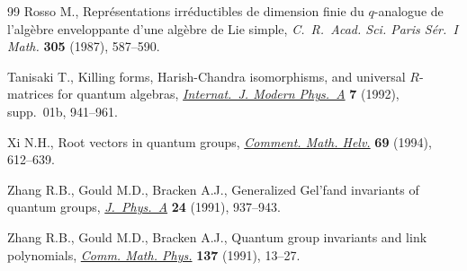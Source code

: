 \documentclass[pdftex]{sigma}
\numberwithin{equation}{section}
\begin{document}
\begin{thebibliography}{99}
Rosso M., Repr\'esentations irr\'eductibles de dimension finie du
 {$q$}-analogue de l'alg\`ebre enveloppante d'une alg\`ebre de {L}ie simple,
 \textit{C.~R.~Acad. Sci. Paris S\'er.~I Math.} \textbf{305} (1987), 587--590.

Tanisaki T., Killing forms, {H}arish-{C}handra isomorphisms, and universal
 {$R$}-matrices for quantum algebras, \href{https://doi.org/10.1142/s0217751x92004117}{\textit{Internat.~J. Modern Phys.~A}}
 \textbf{7} (1992), supp.~01b, 941--961.

Xi N.H., Root vectors in quantum groups, \href{https://doi.org/10.1007/BF02564506}{\textit{Comment. Math. Helv.}}
 \textbf{69} (1994), 612--639.

Zhang R.B., Gould M.D., Bracken A.J., Generalized {G}el'fand invariants of
 quantum groups, \href{https://dx.doi.org/10.1088/0305-4470/24/5/009}{\textit{J.~Phys.~A}} \textbf{24} (1991), 937--943.

Zhang R.B., Gould M.D., Bracken A.J., Quantum group invariants and link
 polynomials, \href{https://doi.org/10.1007/BF02099115}{\textit{Comm. Math. Phys.}} \textbf{137} (1991), 13--27.

\end{thebibliography}\LastPageEnding
\end{document}
